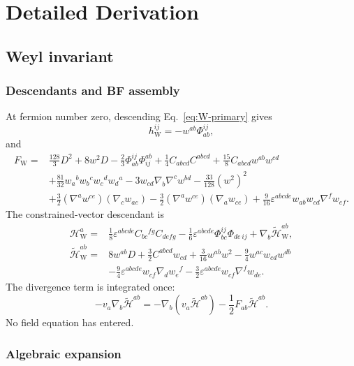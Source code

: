 \documentclass[11pt]{article}
\newcommand{\eps}{\varepsilon}
\newcommand{\Weyl}{\mathrm W}
\begin{document}
\section{Detailed Derivation}

\subsection{Weyl invariant}

\subsubsection{Descendants and BF assembly}

At fermion number zero, descending Eq.~\eqref{eq:W-primary} gives
\begin{equation}
h_{\Weyl}^{ij}=-w^{ab}\Phi_{ab}^{ij},
\label{eq:W-lowest}
\end{equation}
and
\begin{align}
F_{\Weyl}={}&\frac{128}{3}D^2+8w^2D
-\frac23\Phi_{ab}^{ij}\Phi^{ab}_{ij}
+\frac14C_{abcd}C^{abcd}
+\frac{15}{8}C_{abcd}w^{ab}w^{cd}
\nonumber\\
&+\frac{81}{32}w_a{}^bw_b{}^cw_c{}^dw_d{}^a
-3w_{cd}\nabla_b\nabla^cw^{bd}
-\frac{33}{128}(w^2)^2
\nonumber\\
&+\frac32(\nabla^aw^{ce})(\nabla_cw_{ae})
-\frac32(\nabla^aw^{ce})(\nabla_aw_{ce})
+\frac9{16}\eps^{abcde}w_{ab}w_{cd}\nabla^fw_{ef}.
\label{eq:W-Fdesc}
\end{align}
The constrained-vector descendant is
\begin{align}
\mathcal H_{\Weyl}^a={}&\frac18\eps^{abcde}C_{bc}{}^{fg}C_{de fg}
-\frac16\eps^{abcde}\Phi_{bc}^{ij}\Phi_{de\,ij}
+\nabla_b\widetilde{\mathcal H}_{\Weyl}^{ab},
\label{eq:W-Hdesc}\\
\widetilde{\mathcal H}_{\Weyl}^{ab}={}&
8w^{ab}D+\frac32C^{abcd}w_{cd}+\frac3{16}w^{ab}w^2
-\frac94w^{ac}w_{cd}w^{db}
\nonumber\\
&-\frac94\eps^{abcde}w_{cf}\nabla_dw_e{}^f
-\frac32\eps^{abcde}w_{cf}\nabla^fw_{de}.
\label{eq:W-Htilde}
\end{align}
The divergence term is integrated once:
\begin{equation}
-v_a\nabla_b\widetilde{\mathcal H}^{ab}
=-\nabla_b(v_a\widetilde{\mathcal H}^{ab})
-\frac12F_{ab}\widetilde{\mathcal H}^{ab}.
\label{eq:BF-ibp}
\end{equation}
No field equation has entered.

\subsubsection{Algebraic expansion}
\end{document}
